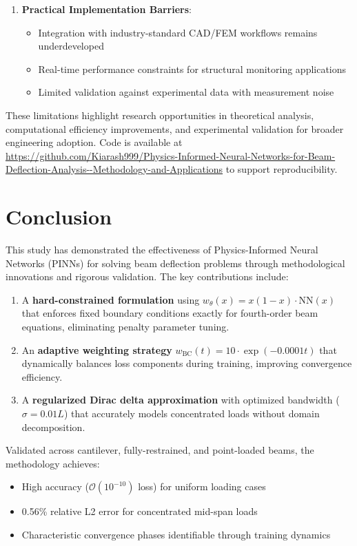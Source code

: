\documentclass[12pt]{article}
\begin{document}
\begin{enumerate}
\item \textbf{Practical Implementation Barriers}: 
\begin{itemize}
	\item Integration with industry-standard CAD/FEM workflows remains underdeveloped
\item Real-time performance constraints for structural monitoring applications
\item Limited validation against experimental data with measurement noise
\end{itemize}
\end{enumerate}

These limitations highlight research opportunities in theoretical analysis, computational efficiency improvements, and experimental validation for broader engineering adoption. Code is available at \url{https://github.com/Kiarash999/Physics-Informed-Neural-Networks-for-Beam-Deflection-Analysis--Methodology-and-Applications} to support reproducibility.


\section{Conclusion}
This study has demonstrated the effectiveness of Physics-Informed Neural Networks (PINNs) for solving beam deflection problems through methodological innovations and rigorous validation. The key contributions include:

\begin{enumerate}
	\item A \textbf{hard-constrained formulation} using $w_{\theta}(x) = x(1-x)\cdot\text{NN}(x)$ that enforces fixed boundary conditions exactly for fourth-order beam equations, eliminating penalty parameter tuning.
	\item  An \textbf{adaptive weighting strategy} $w_{\text{BC}}(t)=10\cdot\exp(-0.0001t)$ that dynamically balances loss components during training, improving convergence efficiency.
	\item  A \textbf{regularized Dirac delta approximation} with optimized bandwidth ($\sigma = 0.01L$) that accurately models concentrated loads without domain decomposition.
\end{enumerate}

Validated across cantilever, fully-restrained, and point-loaded beams, the methodology achieves:
\begin{itemize}
	\item High accuracy ($\mathcal{O}(10^{-10})$ loss) for uniform loading cases
	\item 0.56\% relative L2 error for concentrated mid-span loads
	\item Characteristic convergence phases identifiable through training dynamics
\end{itemize}
\end{document}
